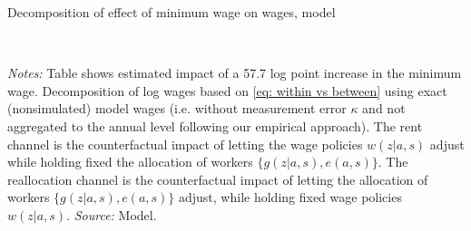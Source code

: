\begin{table}[!htb]
  \begin{small}
  \centering
  \caption{Decomposition of effect of minimum wage on wages, model\label{table: wage decomposition}}
  \\
  \posttabvspace
  \begin{minipage}[t]{1\columnwidth}%
    \begin{spacing}{0.75}
      {\scriptsize \textit{Notes:} Table shows estimated impact of a 57.7 log point increase in the minimum wage. Decomposition of log wages based on \eqref{eq: within vs between} using exact (nonsimulated) model wages (i.e. without  measurement error $\kappa$ and not aggregated to the annual level following our empirical approach). The rent channel is the counterfactual impact of letting the wage policies $w(z|a,s)$ adjust while holding fixed the allocation of workers $\{g(z|a,s),e(a,s)\}$. The reallocation channel is the counterfactual impact of letting the allocation of workers $\{g(z|a,s),e(a,s)\}$ adjust, while holding fixed wage policies $w(z|a,s)$. %
      \textit{Source:} Model.}
    \end{spacing}
  \end{minipage}
 \end{small}
\end{table}

